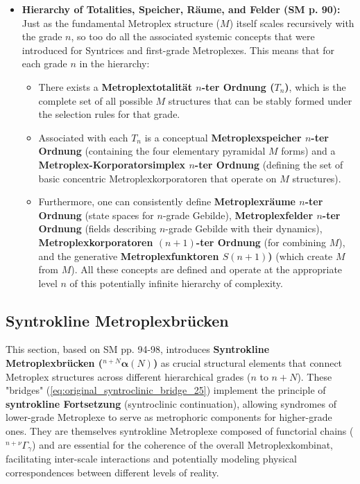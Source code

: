 \documentclass[12pt]{article}
\def\metroplex#1#2{M}%
\newcommand{\metroplextotalitaet}[1]{T_{#1}}
\newcommand{\metroplexfunktor}{S}
\newcommand{\syntroklinebruecke}[1]{{}^{#1}\bm{\alpha}}
\begin{document}
\begin{itemize}
    \item \textbf{Hierarchy of Totalities, Speicher, Räume, and Felder (SM p. 90):}
    Just as the fundamental Metroplex structure (\( \metroplex{n}{} \)) itself scales recursively with the grade \( n \), so too do all the associated systemic concepts that were introduced for Syntrices and first-grade Metroplexes. This means that for each grade \( n \) in the hierarchy:
    \begin{itemize}
        \item There exists a \textbf{Metroplextotalität \( n \)-ter Ordnung (\( \metroplextotalitaet{n} \))}, which is the complete set of all possible \( \metroplex{n}{} \) structures that can be stably formed under the selection rules for that grade.
        \item Associated with each \( \metroplextotalitaet{n} \) is a conceptual \textbf{Metroplexspeicher \( n \)-ter Ordnung} (containing the four elementary pyramidal \( \metroplex{n}{} \) forms) and a \textbf{Metroplex-Korporatorsimplex \( n \)-ter Ordnung} (defining the set of basic concentric Metroplexkorporatoren that operate on \( \metroplex{n}{} \) structures).
        \item Furthermore, one can consistently define \textbf{Metroplexräume \( n \)-ter Ordnung} (state spaces for \(n\)-grade Gebilde), \textbf{Metroplexfelder \( n \)-ter Ordnung} (fields describing \(n\)-grade Gebilde with their dynamics), \textbf{Metroplexkorporatoren \( (n+1) \)-ter Ordnung} (for combining \( \metroplex{n}{} \)), and the generative \textbf{Metroplexfunktoren \( \metroplexfunktor(n+1) \))} (which create \( \metroplex{n}{} \) from \( \metroplex{n-1}{} \)). All these concepts are defined and operate at the appropriate level \( n \) of this potentially infinite hierarchy of complexity.
    \end{itemize}
\end{itemize}

\subsection{Syntrokline Metroplexbrücken}
\label{sec:metroplex_bridges}

This section, based on SM pp. 94-98, introduces \textbf{Syntrokline Metroplexbrücken (\(\syntroklinebruecke{n+N}(N)\))} as crucial structural elements that connect Metroplex structures across different hierarchical grades (\(n\) to \(n+N\)). These "bridges" (\eqref{eq:original_syntroclinic_bridge_25}) implement the principle of \textbf{syntrokline Fortsetzung} (syntroclinic continuation), allowing syndromes of lower-grade Metroplexe to serve as metrophoric components for higher-grade ones. They are themselves syntrokline Metroplexe composed of functorial chains (\( {}^{n+\nu}\Gamma_\gamma \)) and are essential for the coherence of the overall Metroplexkombinat, facilitating inter-scale interactions and potentially modeling physical correspondences between different levels of reality.
\end{document}
